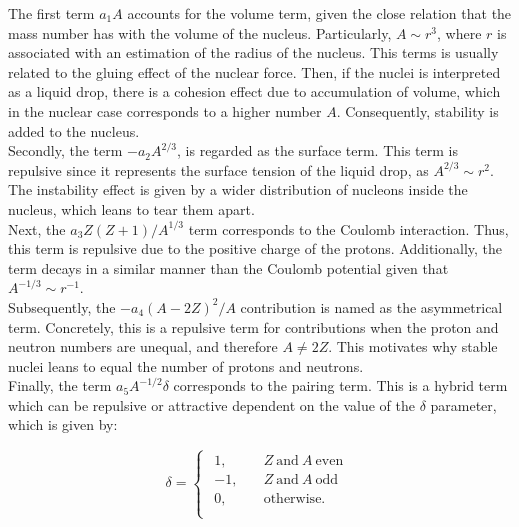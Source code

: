 \documentclass[openany]{book}
\begin{document}
The first term $a_1A$ accounts for the volume term, given the close relation that the mass number has with the volume of the nucleus. Particularly, $A \sim r^3$, where $r$ is associated with an estimation of the radius of the nucleus. This terms is usually related to the gluing effect of the nuclear force. Then, if the nuclei is interpreted as a liquid drop, there is a cohesion effect due to accumulation of volume, which in the nuclear case corresponds to a higher number $A$. Consequently, stability is added to the nucleus.   \\

Secondly, the term $- a_2A^{2/3} $, is regarded as the surface term. This term is repulsive since it represents the surface tension of the liquid drop, as $A^{2/3}  \sim r^2$. The instability effect is given by a wider distribution of nucleons inside the nucleus, which leans to tear them apart. \\

Next, the $ a_3 Z(Z+1)/A^{1/3}$ term corresponds to the Coulomb interaction. Thus, this term is repulsive due to the positive charge of the protons. Additionally, the term decays in a similar manner than the Coulomb potential given that $A^{-1/3} \sim r^{-1}$. \\

Subsequently, the $ -a_4 (A - 2Z)^2/A$ contribution is named as the asymmetrical term. Concretely, this is a repulsive term for contributions when the proton and neutron numbers are unequal, and therefore $A \neq 2Z$. This motivates why stable nuclei leans to equal the number of protons and neutrons.\\ 

Finally, the term $a_5 A^{-1/2} \delta$ corresponds to the pairing term. This is a hybrid term which can be repulsive or attractive dependent on the value of the $\delta$ parameter, which is given by:

\begin{equation} \label{eq:liquidDrop_deltaFactor}
	\delta = 	\left\{\begin{array}{l}
		\begin{split}
			1, \quad & Z \ \mathrm{and} \ A \  \mathrm{even} \\ 
			-1, \quad &  Z \ \mathrm{and} \ A \  \mathrm{odd} 	\\
			0, \quad & \mathrm{otherwise}.	\\
		\end{split}
	\end{array}\right.
\end{equation}
\end{document}
